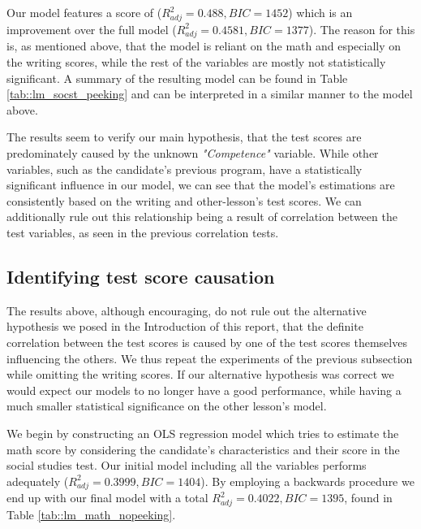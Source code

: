 \documentclass[10pt, a4paper]{article}
\begin{document}
	Our model features a score of ($R^2_{adj} = 0.488, BIC=1452$) which is an improvement over the full model ($R^2_{adj} = 0.4581, BIC=1377$). The reason for this is, as mentioned above, that the model is reliant on the math and especially on the writing scores, while the rest of the variables are mostly not statistically significant. A summary of the resulting model can be found in Table \ref{tab::lm_socst_peeking} and can be interpreted in a similar manner to the model above.
	
	The results seem to verify our main hypothesis, that the test scores are predominately caused by the unknown \textit{"Competence"} variable. While other variables, such as the candidate's previous program, have a statistically significant influence in our model, we can see that the model's estimations are consistently based on the writing and other-lesson's test scores. We can additionally rule out this relationship being a result of correlation between the test variables, as seen in the previous correlation tests.
	\unskip
	\subsection{Identifying test score causation}
	
	The results above, although encouraging, do not rule out the alternative hypothesis we posed in the Introduction of this report, that the definite correlation between the test scores is caused by one of the test scores themselves influencing the others. We thus repeat the experiments of the previous subsection while omitting the writing scores. If our alternative hypothesis was correct we would expect our models to no longer have a good performance, while having a much smaller statistical significance on the other lesson's model.
	
	We begin by constructing an OLS regression model which tries to estimate the math score by considering the candidate's characteristics and their score in the social studies test. Our initial model including all the variables performs adequately ($R^2_{adj} = 0.3999, BIC=1404$). By employing a backwards procedure we end up with our final model with a total $R^2_{adj} = 0.4022, BIC=1395$, found in Table \ref{tab::lm_math_nopeeking}.
	
\end{document}
